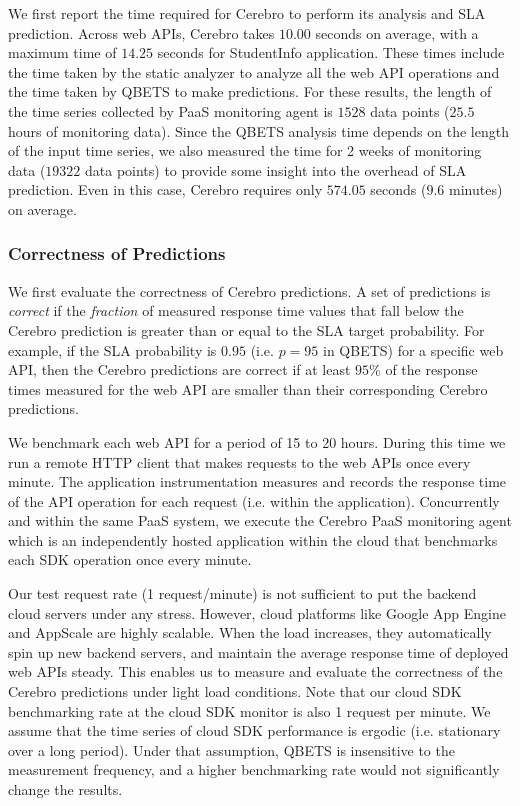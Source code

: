 We first report the time required for Cerebro to perform its analysis and SLA prediction.
Across web APIs, Cerebro takes $10.00$ seconds on average, with a 
maximum time of $14.25$ seconds for StudentInfo application.
These times include the time taken
by the static analyzer to analyze all the web API operations
and the time taken by QBETS to make predictions. For these results, the length of 
the time series collected by PaaS monitoring agent is $1528$ data points ($25.5$ hours of monitoring data). Since the QBETS analysis time depends on the length of the input time series, 
we also measured the time for 2 weeks of monitoring data ($19322$ data points) to provide
some insight into the overhead of SLA prediction.  Even in this case, Cerebro
requires only $574.05$ seconds ($9.6$ minutes) on average.

\subsubsection{Correctness of Predictions}
\label{sec:correctness}

We first evaluate the correctness of Cerebro predictions.  A set of
predictions is \textit{correct} if the \textit{fraction} of measured 
response time values that fall below the Cerebro prediction is greater than 
or equal to the SLA target probability. 
For example, if the SLA probability is $0.95$ (i.e. $p=95$ in QBETS) for
a specific web API, then the Cerebro predictions are correct if at least
$95\%$ of the response times measured for the web API are smaller than their
corresponding Cerebro predictions. 

We benchmark each web API for a period of 15 to 20 hours.  During this time we
run a remote HTTP client that makes requests to the web APIs once every
minute. The application instrumentation measures and records the response
time of the API operation for each request (i.e. within the application).
Concurrently and within the same PaaS system, we execute the Cerebro
PaaS monitoring agent which is an independently hosted application within the
cloud that benchmarks each SDK operation once every minute.

Our test request rate (1 request/minute) is not sufficient to put the backend cloud servers
under any stress. However, cloud platforms like Google App Engine and
AppScale are highly scalable. When the load increases, they automatically spin up new backend servers,
and maintain the average response time of deployed web APIs steady. This 
enables us to measure and evaluate the correctness of the Cerebro predictions under
light load conditions. Note that our cloud SDK benchmarking rate at the cloud SDK monitor
is also 1 request per minute. We assume that the time series of cloud SDK performance is ergodic
(i.e. stationary over a long period). Under that assumption, QBETS is insensitive to the measurement
frequency, and a higher benchmarking rate would not significantly change the results.

